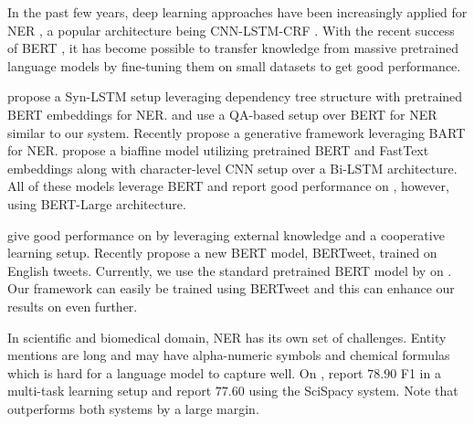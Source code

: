 In the past few years, deep learning approaches have been increasingly applied for NER \cite{torfi2020natural, li2020survey}, a popular architecture being CNN-LSTM-CRF \cite{ma2016end}. 
With the recent success of BERT \cite{devlin2019bert}, it has become possible to transfer knowledge from massive pretrained language models by fine-tuning them on small datasets to get good performance.

\cite{xu2021better} propose a Syn-LSTM setup leveraging dependency tree structure with pretrained BERT embeddings for NER. \cite{li2020MRC} and \cite{li2019dice} %
use a QA-based setup over BERT for NER similar to our system.  
Recently \cite{yan2021unified} propose a generative framework leveraging BART \cite{lewis2019bart} for NER. \cite{yu2020named} propose a biaffine model utilizing pretrained BERT and FastText \cite{bojanowski2017enriching} embeddings along with character-level CNN setup over a Bi-LSTM architecture. All of these models leverage BERT and report good performance on , however, using BERT-Large architecture. 

\cite{wang2021improving} give good performance on  by leveraging external knowledge and a cooperative learning setup. Recently \cite{nguyen2020bertweet} propose a new BERT model, BERTweet, trained on English tweets. Currently, we use the standard pretrained BERT model by \cite{devlin2019bert} on . Our framework can easily be trained using BERTweet and this can enhance our results on  even further.

In scientific and biomedical domain, NER has its own set of challenges. Entity mentions are long and may have alpha-numeric symbols and chemical formulas which is hard for a language model to capture well. 
On , \cite{crichton2017neural} report $78.90$ F1 in a multi-task learning setup and \cite{neumann2019scispacy} report $77.60$ using the SciSpacy system.
Note that \modelname{} outperforms both systems by a large margin.

